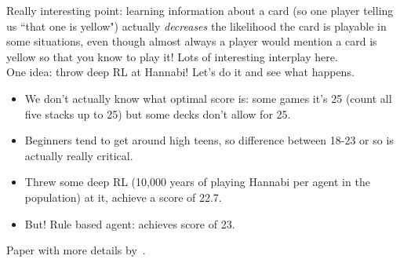 Really interesting point: learning information about a card (so one player telling us ``that one is yellow") actually {\it decreases} the likelihood the card is playable in some situations, even though almost always a player would mention a card is yellow so that you know to play it! Lots of interesting interplay here. \\

One idea: throw deep RL at Hannabi! Let's do it and see what happens.
\begin{itemize}
    \item We don't actually know what optimal score is: some games it's 25 (count all five stacks up to 25) but some decks don't allow for 25.
    \item Beginners tend to get around high teens, so difference between 18-23 or so is actually really critical.
    \item Threw some deep RL (10,000 years of playing Hannabi per agent in the population) at it, achieve a score of 22.7.
    \item But! Rule based agent: achieves score of 23.
\end{itemize}


Paper with more details by~\citet{bard2019hanabi}. 

\spacerule

